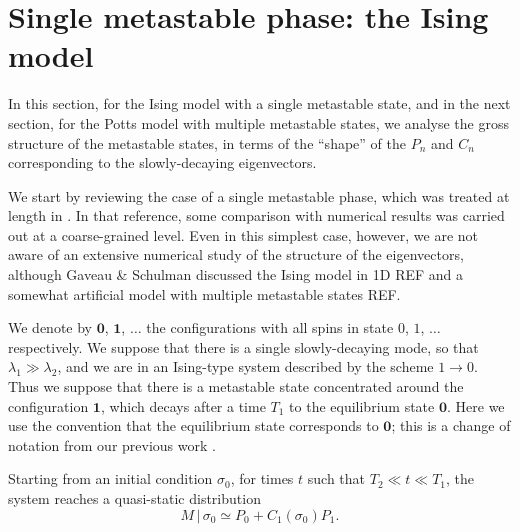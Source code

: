 \documentclass[10pt]{article}
\newcommand{\zeros}{\mathbf{0}}
\newcommand{\ones}{\mathbf{1}}
\newcommand{\given}{\, | \,}
\begin{document}
\section{Single metastable phase: the Ising model}


In this section, for the Ising model with a single metastable state, and in the next section, for the Potts model with multiple metastable states, we analyse the gross structure of the metastable states, in terms of the ``shape'' of the $P_n$ and $C_n$ corresponding to the slowly-decaying eigenvectors.

We start by reviewing the case of a single metastable phase, which was treated at
length in \cite{LarraldeLeyvrazSandersJStatMech2006}. In that reference, some comparison
with numerical results was carried out at a coarse-grained level.  Even in this simplest case, however, we are not aware of an extensive 
numerical study of the structure of the eigenvectors, although Gaveau \& Schulman discussed the Ising model in 1D REF and a somewhat artificial model with multiple metastable states REF.

We denote by $\zeros$, $\ones$, $\ldots$ the configurations with all spins in state $0$, $1$, $\ldots$ respectively.
We suppose that there is a single slowly-decaying mode, so that $\lambda_1 \gg
\lambda_2$, and we are in an Ising-type system described by the scheme $1 \to 0$.
Thus we suppose that there is a metastable state concentrated around the configuration $\ones$, which decays after a time $T_1$ to the equilibrium state $\zeros$. Here we use the convention that the equilibrium state corresponds to
$\zeros$;
this is a change of notation from our previous work
\cite{SandersLarraldeLeyvrazCompetitiveNucleationPottsPRB2007}.





 Starting from an initial
condition $\sigma_0$, for times $t$ such that $T_2 \ll t \ll T_1$, the system reaches a quasi-static distribution
\begin{equation}
 M \given \sigma_0 \simeq P_0 + C_1(\sigma_0) P_1.
\label{eq:defn-M-ising}
\end{equation}
\end{document}
